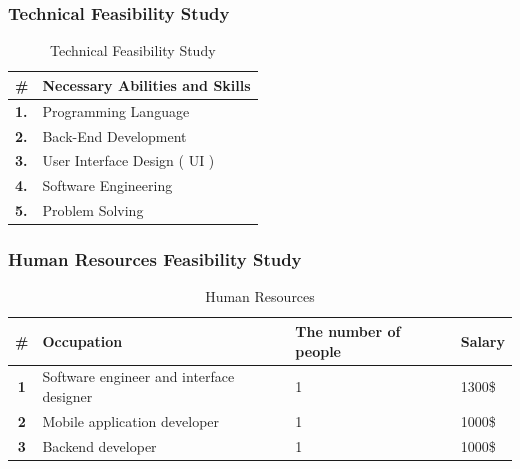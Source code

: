\documentclass[12pt]{article}
\begin{document}
				\subsubsection{Technical Feasibility Study}
				\begin{table}[!h]
					\centering
					\caption{Technical Feasibility Study}
					\begin{tabular}{|l|l|}
						\hline
						\rowcolor{lightgray}
						\# & \textbf{Necessary Abilities and Skills}\\
						\hline
						\cellcolor{lightgray}\textbf{1.} &  Programming Language \\
						\hline
						\cellcolor{lightgray}\textbf{2.} & Back-End Development \\
						\hline
						\cellcolor{lightgray}\textbf{3.} & User Interface Design ( UI )\\
						\hline
						\cellcolor{lightgray}\textbf{4.} & Software Engineering \\
						\hline
						\cellcolor{lightgray}\textbf{5.} & Problem Solving\\
						\hline
					\end{tabular}
				\end{table}
			\subsubsection{Human Resources Feasibility Study }
		\begin{table}[!h]
			\centering
			\caption{Human Resources}
			\begin{tabular}{|c|p{3.4cm}|l|l|}
				\hline
				\rowcolor{lightgray}
				\# & \textbf{Occupation} & \textbf{The number of people} & \textbf{Salary} \\
				\hline
				\cellcolor{lightgray}\textbf{1} & Software engineer and interface designer & 1 & 1300\$\\
				\hline
				\cellcolor{lightgray}\textbf{2} & Mobile application developer & 1 & 1000\$ \\
				\hline
				\cellcolor{lightgray}\textbf{3} &  Backend developer & 1 & 1000\$ \\
				\hline
			\end{tabular}
		\end{table}
			
		\begin{center}
			\newpage
		\end{center}
\end{document}

